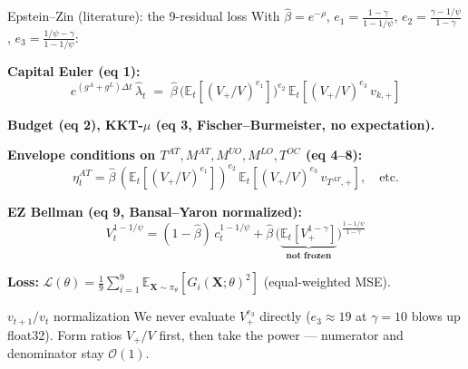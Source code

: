 \documentclass[aspectratio=169,11pt]{beamer}
\newcommand{\X}{\bm{X}}
\begin{document}
\begin{frame}{Epstein--Zin (literature): the 9-residual loss}
\footnotesize
With $\hat\beta = e^{-\rho}$, $e_1 = \frac{1-\gamma}{1-1/\psi}$, $e_2 = \frac{\gamma - 1/\psi}{1-\gamma}$, $e_3 = \frac{1/\psi - \gamma}{1-1/\psi}$:

\textbf{Capital Euler (eq 1):}
\[
e^{(g^{\!A}+g^{\!L})\Delta t}\,\hat\lambda_t \;=\; \hat\beta\,\big(\mathbb{E}_t[(V_+/V)^{e_1}]\big)^{e_2}\,\mathbb{E}_t\!\left[(V_+/V)^{e_3}\,v_{k,+}\right]
\]

\textbf{Budget (eq 2), KKT-$\mu$ (eq 3, Fischer–Burmeister, no expectation).}

\textbf{Envelope conditions on $T^{\!AT}, M^{\!AT}, M^{\!UO}, M^{\!LO}, T^{\!OC}$ (eq 4–8):}
\[
\eta^{\!AT}_t = \hat\beta\,(\mathbb{E}_t[(V_+/V)^{e_1}])^{e_2}\,\mathbb{E}_t[(V_+/V)^{e_3}\,v_{T^{\!AT}\!,+}], \quad \text{etc.}
\]

\textbf{EZ Bellman (eq 9, Bansal–Yaron normalized):}
\[
V_t^{1-1/\psi} = (1-\hat\beta)\,c_t^{1-1/\psi} + \hat\beta\,\big(\underbrace{\mathbb{E}_t[V_+^{1-\gamma}]}_{\textbf{not frozen}}\big)^{\!\frac{1-1/\psi}{1-\gamma}}
\]

\textbf{Loss:} $\mathcal{L}(\theta) = \frac{1}{9}\sum_{i=1}^{9}\mathbb{E}_{\X\sim\pi_\theta}[G_i(\X;\theta)^2]$ \quad (equal-weighted MSE).

\begin{alertblock}{$v_{t+1}/v_t$ normalization}
We never evaluate $V_+^{e_3}$ directly ($e_3 \approx 19$ at $\gamma=10$ blows up float32). Form ratios $V_+/V$ first, then take the power --- numerator and denominator stay $\mathcal{O}(1)$.
\end{alertblock}
\end{frame}
\end{document}
